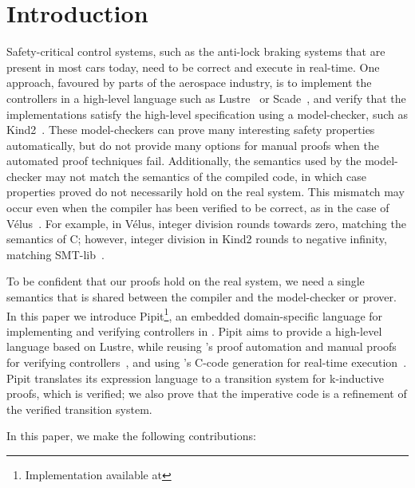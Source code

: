\section{Introduction}
Safety-critical control systems, such as the anti-lock braking systems that are present in most cars today, need to be correct and execute in real-time.
One approach, favoured by parts of the aerospace industry, is to implement the controllers in a high-level language such as Lustre~\cite{caspi1995functional} or Scade~\cite{colaco2017scade}, and verify that the implementations satisfy the high-level specification using a model-checker, such as Kind2~\cite{champion2016kind2}.
These model-checkers can prove many interesting safety properties automatically, but do not provide many options for manual proofs when the automated proof techniques fail.
Additionally, the semantics used by the model-checker may not match the semantics of the compiled code, in which case properties proved do not necessarily hold on the real system.
This mismatch may occur even when the compiler has been verified to be correct, as in the case of Vélus~\cite{bourke2017formally}.
For example, in Vélus, integer division rounds towards zero, matching the semantics of C; however, integer division in Kind2 rounds to negative infinity, matching SMT-lib~\cite{BarFT2016SMTLIB,kind2023intdiv}.

To be confident that our proofs hold on the real system, we need a single semantics that is shared between the compiler and the model-checker or prover.
In this paper we introduce Pipit\footnote{Implementation available at \GITHUBURL}, an embedded domain-specific language for implementing and verifying controllers in \fstar{}.
Pipit aims to provide a high-level language based on Lustre, while reusing \fstar{}'s proof automation and manual proofs for verifying controllers~\cite{martinez2019meta}, and using \lowstar{}'s C-code generation for real-time execution~\cite{protzenko2017verified}.
Pipit translates its expression language to a transition system for k-inductive proofs, which is verified; we also prove that the imperative code is a refinement of the verified transition system.



In this paper, we make the following contributions:

